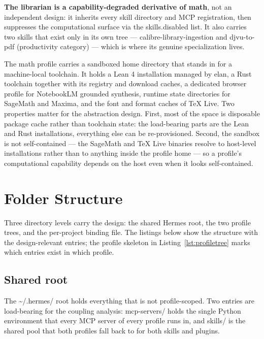 \documentclass[10pt]{article}
\newcommand{\mono}[1]{{\ttfamily\small #1}}
\begin{document}
\textbf{The librarian is a capability-degraded derivative of math}, not an independent design: it
inherits every skill directory and MCP registration, then suppresses the computational surface via
the \mono{skills.disabled} list. It also carries two skills that exist only in its own tree ---
\mono{calibre-library-ingestion} and \mono{djvu-to-pdf} (productivity category) --- which is where
its genuine specialization lives.

The math profile carries a sandboxed home directory that stands in for a machine-local toolchain.
It holds a Lean 4 installation managed by elan, a Rust toolchain together with its registry and
download caches, a dedicated browser profile for NotebookLM grounded synthesis, runtime state
directories for SageMath and Maxima, and the font and format caches of TeX Live. Two properties
matter for the abstraction design. First, most of the space is disposable package cache rather than
toolchain state: the load-bearing parts are the Lean and Rust installations, everything else can be
re-provisioned. Second, the sandbox is not self-contained --- the SageMath and TeX Live binaries
resolve to host-level installations rather than to anything inside the profile home --- so a
profile's computational capability depends on the host even when it looks self-contained.

\section{Folder Structure}\label{sec:folders}

Three directory levels carry the design: the shared Hermes root, the two profile trees, and the
per-project binding file. The listings below show the structure with the design-relevant entries;
the profile skeleton in Listing~\ref{lst:profiletree} marks which entries exist in which profile.

\subsection*{Shared root}

The \mono{\textasciitilde/.hermes/} root holds everything that is not profile-scoped. Two entries
are load-bearing for the coupling analysis: \mono{mcp-servers/} holds the single Python environment
that every MCP server of every profile runs in, and \mono{skills/} is the shared pool that both
profiles fall back to for both skills and plugins.
\end{document}
